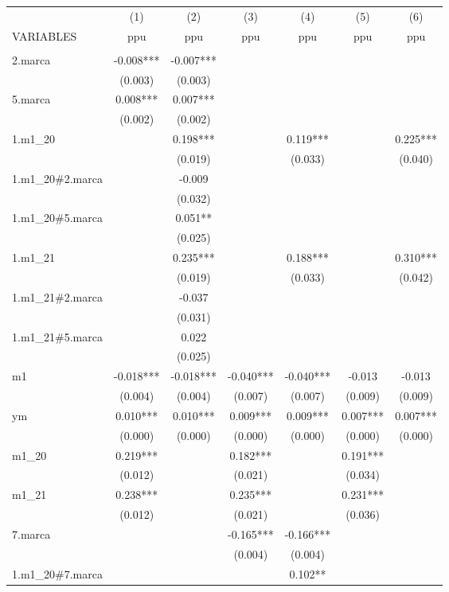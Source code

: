 \begin{tabular}{lcccccc} \hline
 & (1) & (2) & (3) & (4) & (5) & (6) \\
VARIABLES & ppu & ppu & ppu & ppu & ppu & ppu \\ \hline
 &  &  &  &  &  &  \\
2.marca & -0.008*** & -0.007*** &  &  &  &  \\
 & (0.003) & (0.003) &  &  &  &  \\
5.marca & 0.008*** & 0.007*** &  &  &  &  \\
 & (0.002) & (0.002) &  &  &  &  \\
1.m1\_20 &  & 0.198*** &  & 0.119*** &  & 0.225*** \\
 &  & (0.019) &  & (0.033) &  & (0.040) \\
1.m1\_20\#2.marca &  & -0.009 &  &  &  &  \\
 &  & (0.032) &  &  &  &  \\
1.m1\_20\#5.marca &  & 0.051** &  &  &  &  \\
 &  & (0.025) &  &  &  &  \\
1.m1\_21 &  & 0.235*** &  & 0.188*** &  & 0.310*** \\
 &  & (0.019) &  & (0.033) &  & (0.042) \\
1.m1\_21\#2.marca &  & -0.037 &  &  &  &  \\
 &  & (0.031) &  &  &  &  \\
1.m1\_21\#5.marca &  & 0.022 &  &  &  &  \\
 &  & (0.025) &  &  &  &  \\
m1 & -0.018*** & -0.018*** & -0.040*** & -0.040*** & -0.013 & -0.013 \\
 & (0.004) & (0.004) & (0.007) & (0.007) & (0.009) & (0.009) \\
ym & 0.010*** & 0.010*** & 0.009*** & 0.009*** & 0.007*** & 0.007*** \\
 & (0.000) & (0.000) & (0.000) & (0.000) & (0.000) & (0.000) \\
m1\_20 & 0.219*** &  & 0.182*** &  & 0.191*** &  \\
 & (0.012) &  & (0.021) &  & (0.034) &  \\
m1\_21 & 0.238*** &  & 0.235*** &  & 0.231*** &  \\
 & (0.012) &  & (0.021) &  & (0.036) &  \\
7.marca &  &  & -0.165*** & -0.166*** &  &  \\
 &  &  & (0.004) & (0.004) &  &  \\
1.m1\_20\#7.marca &  &  &  & 0.102** &  &  \\

\end{tabular}
